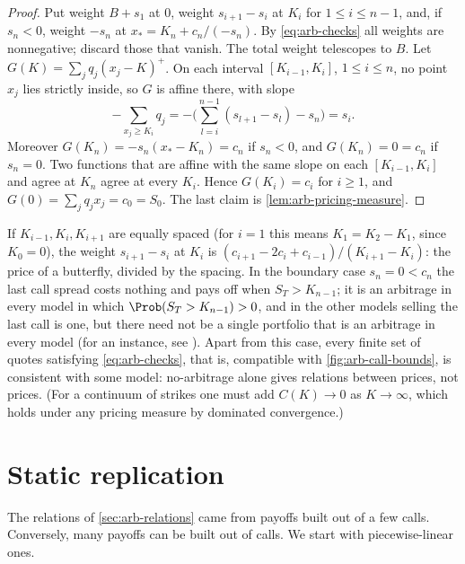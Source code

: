 \begin{proof}
Put weight $B+s_1$ at $0$, weight $s_{i+1}-s_i$ at $K_i$ for $1\le i\le n-1$, and, if
$s_n<0$, weight $-s_n$ at $x_*=K_n+c_n/(-s_n)$. By \eqref{eq:arb-checks} all weights are
nonnegative; discard those that vanish. The total weight telescopes to $B$. Let
$G(K)=\sum_jq_j(x_j-K)^+$. On each interval $[K_{i-1},K_i]$, $1\le i\le n$, no point $x_j$
lies strictly inside, so $G$ is affine there, with slope
\[
  -\sum_{x_j\ge K_i}q_j=-\Big(\sum_{l=i}^{n-1}(s_{l+1}-s_l)-s_n\Big)=s_i .
\]
Moreover $G(K_n)=-s_n(x_*-K_n)=c_n$ if $s_n<0$, and $G(K_n)=0=c_n$ if $s_n=0$. Two functions
that are affine with the same slope on each $[K_{i-1},K_i]$ and agree at $K_n$ agree at every
$K_i$. Hence $G(K_i)=c_i$ for $i\ge1$, and $G(0)=\sum_jq_jx_j=c_0=S_0$. The last claim is
\cref{lem:arb-pricing-measure}.
\end{proof}

If $K_{i-1},K_i,K_{i+1}$ are equally spaced (for $i=1$ this means $K_1=K_2-K_1$, since
$K_0=0$), the weight $s_{i+1}-s_i$ at $K_i$ is $(c_{i+1}-2c_i+c_{i-1})/(K_{i+1}-K_i)$: the
price of a butterfly, divided by the spacing. In the boundary case $s_n=0<c_n$ the last call
spread costs nothing and pays off when $S_T>K_{n-1}$; it is an arbitrage in every model in
which $\Prob(S_T>K_{n-1})>0$, and in the other models selling the last call is one, but there
need not be a single portfolio that is an arbitrage in every model (for an instance, see
). Apart from this case, every finite set of quotes satisfying
\eqref{eq:arb-checks}, that is, compatible with \cref{fig:arb-call-bounds}, is consistent
with some model: no-arbitrage alone gives relations between prices, not prices. (For a
continuum of strikes one must add $C(K)\to0$ as $K\to\infty$, which holds under any pricing
measure by dominated convergence.)


\section{Static replication}\label{sec:arb-replication}

The relations of \cref{sec:arb-relations} came from payoffs built out of a few calls.
Conversely, many payoffs can be built out of calls. We start with piecewise-linear ones.

